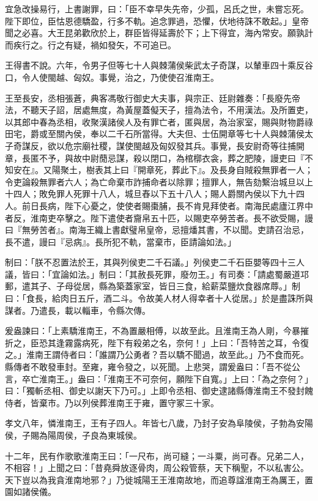 \begin{pinyinscope}
宜急改操易行，上書謝罪，曰：「臣不幸早失先帝，少孤，呂氏之世，未嘗忘死。陛下即位，臣怙恩德驕盈，行多不軌。追念罪過，恐懼，伏地待誅不敢起。」皇帝聞之必喜。大王昆弟歡欣於上，群臣皆得延壽於下；上下得宜，海內常安。願孰計而疾行之。行之有疑，禍如發矢，不可追已。

王得書不說。六年，令男子但等七十人與棘蒲侯柴武太子奇謀，以輦車四十乘反谷口，令人使閩越、匈奴。事覺，治之，乃使使召淮南王。

王至長安，丞相張蒼，典客馮敬行御史大夫事，與宗正、廷尉雜奏：「長廢先帝法，不聽天子詔，居處無度，為黃屋蓋儗天子，擅為法令，不用漢法。及所置吏，以其郎中春為丞相，收聚漢諸侯人及有罪亡者，匿與居，為治家室，賜與財物爵祿田宅，爵或至關內侯，奉以二千石所當得。大夫但、士伍開章等七十人與棘蒲侯太子奇謀反，欲以危宗廟社稷，謀使閩越及匈奴發其兵。事覺，長安尉奇等往捕開章，長匿不予，與故中尉蕑忌謀，殺以閉口，為棺槨衣衾，葬之肥陵，謾吏曰『不知安在』。又陽聚土，樹表其上曰『開章死，葬此下』。及長身自賊殺無罪者一人；令吏論殺無罪者六人；為亡命棄市詐捕命者以除罪；擅罪人，無告劾繫治城旦以上十四人；敗免罪人死罪十八人，城旦舂以下五十八人；賜人爵關內侯以下九十四人。前日長病，陛下心憂之，使使者賜棗脯，長不肯見拜使者。南海民處廬江界中者反，淮南吏卒擊之。陛下遣使者齎帛五十匹，以賜吏卒勞苦者。長不欲受賜，謾曰『無勞苦者』。南海王織上書獻璧帛皇帝，忌擅燔其書，不以聞。吏請召治忌，長不遣，謾曰『忌病』。長所犯不軌，當棄市，臣請論如法。」

制曰：「朕不忍置法於王，其與列侯吏二千石議。」列侯吏二千石臣嬰等四十三人議，皆曰：「宜論如法。」制曰：「其赦長死罪，廢勿王。」有司奏：「請處蜀嚴道邛郵，遣其子、子母從居，縣為築蓋家室，皆日三食，給薪菜鹽炊食器席蓐。」制曰：「食長，給肉日五斤，酒二斗。令故美人材人得幸者十人從居。」於是盡誅所與謀者。乃遣長，載以輜車，令縣次傳。

爰盎諫曰：「上素驕淮南王，不為置嚴相傅，以故至此。且淮南王為人剛，今暴摧折之，臣恐其逢霧露病死，陛下有殺弟之名，奈何！」上曰：「吾特苦之耳，令復之。」淮南王謂侍者曰：「誰謂乃公勇者？吾以驕不聞過，故至此。」乃不食而死。縣傳者不敢發車封。至雍，雍令發之，以死聞。上悲哭，謂爰盎曰：「吾不從公言，卒亡淮南王。」盎曰：「淮南王不可奈何，願陛下自寬。」上曰：「為之奈何？」曰：「獨斬丞相、御史以謝天下乃可。」上即令丞相、御史逮諸縣傳淮南王不發封餽侍者，皆棄市。乃以列侯葬淮南王于雍，置守冢三十家。

孝文八年，憐淮南王，王有子四人。年皆七八歲，乃封子安為阜陵侯，子勃為安陽侯，子賜為陽周侯，子良為東城侯。

十二年，民有作歌歌淮南王曰：「一尺布，尚可縫；一斗粟，尚可舂。兄弟二人，不相容！」上聞之曰：「昔堯舜放逐骨肉，周公殺管蔡，天下稱聖，不以私害公。天下豈以為我貪淮南地邪？」乃徙城陽王王淮南故地，而追尊諡淮南王為厲王，置園如諸侯儀。


\end{pinyinscope}
